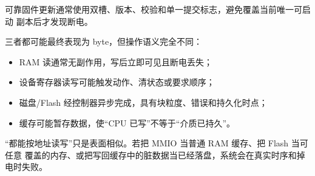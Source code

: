可靠固件更新通常使用双槽、版本、校验和单一提交标志，避免覆盖当前唯一可启动
副本后才发现断电。

三者都可能最终表现为 byte，但操作语义完全不同：

\begin{itemize}[leftmargin=2.2em]
  \item RAM 读通常无副作用，写后立即可见且断电丢失；
  \item 设备寄存器读写可能触发动作、清状态或要求顺序；
  \item 磁盘/Flash 经控制器异步完成，具有块粒度、错误和持久化时点；
  \item 缓存可能暂存数据，使“CPU 已写”不等于“介质已持久”。
\end{itemize}

\begin{failurebox}
“都能按地址读写”只是表面相似。若把 MMIO 当普通 RAM 缓存、把 Flash 当可任意
覆盖的内存、或把写回缓存中的脏数据当已经落盘，系统会在真实时序和掉电时失败。
\end{failurebox}
